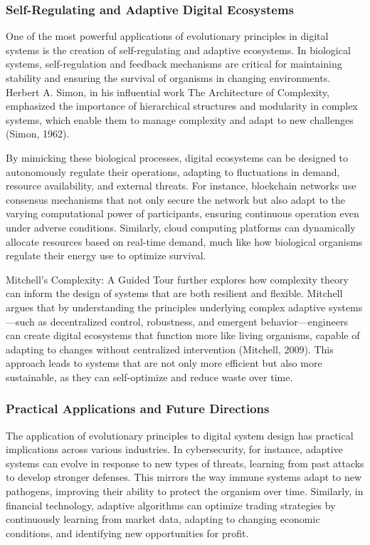 \documentclass[12pt,twoside]{article}
\begin{document}
\subsubsection{Self-Regulating and Adaptive Digital Ecosystems}

One of the most powerful applications of evolutionary principles in digital systems is the creation of self-regulating and adaptive ecosystems. In biological systems, self-regulation and feedback mechanisms are critical for maintaining stability and ensuring the survival of organisms in changing environments. Herbert A. Simon, in his influential work The Architecture of Complexity, emphasized the importance of hierarchical structures and modularity in complex systems, which enable them to manage complexity and adapt to new challenges (Simon, 1962).

By mimicking these biological processes, digital ecosystems can be designed to autonomously regulate their operations, adapting to fluctuations in demand, resource availability, and external threats. For instance, blockchain networks use consensus mechanisms that not only secure the network but also adapt to the varying computational power of participants, ensuring continuous operation even under adverse conditions. Similarly, cloud computing platforms can dynamically allocate resources based on real-time demand, much like how biological organisms regulate their energy use to optimize survival.

Mitchell’s Complexity: A Guided Tour further explores how complexity theory can inform the design of systems that are both resilient and flexible. Mitchell argues that by understanding the principles underlying complex adaptive systems—such as decentralized control, robustness, and emergent behavior—engineers can create digital ecosystems that function more like living organisms, capable of adapting to changes without centralized intervention (Mitchell, 2009). This approach leads to systems that are not only more efficient but also more sustainable, as they can self-optimize and reduce waste over time.

\subsubsection{Practical Applications and Future Directions}

The application of evolutionary principles to digital system design has practical implications across various industries. In cybersecurity, for instance, adaptive systems can evolve in response to new types of threats, learning from past attacks to develop stronger defenses. This mirrors the way immune systems adapt to new pathogens, improving their ability to protect the organism over time. Similarly, in financial technology, adaptive algorithms can optimize trading strategies by continuously learning from market data, adapting to changing economic conditions, and identifying new opportunities for profit.
\end{document}
